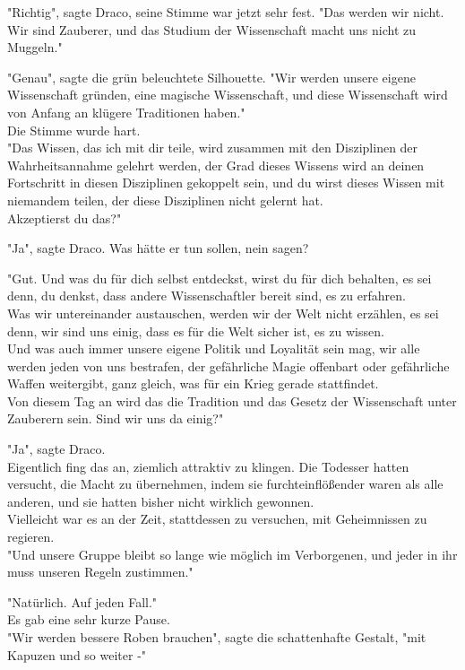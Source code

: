 {"Richtig", sagte Draco, seine Stimme war jetzt sehr fest. "Das werden wir nicht. Wir sind Zauberer, und das Studium der Wissenschaft macht uns nicht zu Muggeln."

"Genau", sagte die grün beleuchtete Silhouette. "Wir werden unsere eigene Wissenschaft gründen, eine magische Wissenschaft, und diese Wissenschaft wird von Anfang an klügere Traditionen haben."\\ Die Stimme wurde hart.\\ "Das Wissen, das ich mit dir teile, wird zusammen mit den Disziplinen der Wahrheitsannahme gelehrt werden, der Grad dieses Wissens wird an deinen Fortschritt in diesen Disziplinen gekoppelt sein, und du wirst dieses Wissen mit niemandem teilen, der diese Disziplinen nicht gelernt hat.\\ Akzeptierst du das?"

"Ja", sagte Draco. Was hätte er tun sollen, nein sagen?

"Gut. Und was du für dich selbst entdeckst, wirst du für dich behalten, es sei denn, du denkst, dass andere Wissenschaftler bereit sind, es zu erfahren.\\ Was wir untereinander austauschen, werden wir der Welt nicht erzählen, es sei denn, wir sind uns einig, dass es für die Welt sicher ist, es zu wissen.\\ Und was auch immer unsere eigene Politik und Loyalität sein mag, wir alle werden jeden von uns bestrafen, der gefährliche Magie offenbart oder gefährliche Waffen weitergibt, ganz gleich, was für ein Krieg gerade stattfindet.\\ Von diesem Tag an wird das die Tradition und das Gesetz der Wissenschaft unter Zauberern sein. Sind wir uns da einig?"

"Ja", sagte Draco.\\ Eigentlich fing das an, ziemlich attraktiv zu klingen. Die Todesser hatten versucht, die Macht zu übernehmen, indem sie furchteinflößender waren als alle anderen, und sie hatten bisher nicht wirklich gewonnen.\\ Vielleicht war es an der Zeit, stattdessen zu versuchen, mit Geheimnissen zu regieren.\\ "Und unsere Gruppe bleibt so lange wie möglich im Verborgenen, und jeder in ihr muss unseren Regeln zustimmen."

"Natürlich. Auf jeden Fall."\\ Es gab eine sehr kurze Pause.\\ "Wir werden bessere Roben brauchen", sagte die schattenhafte Gestalt, "mit Kapuzen und so weiter -"

}
